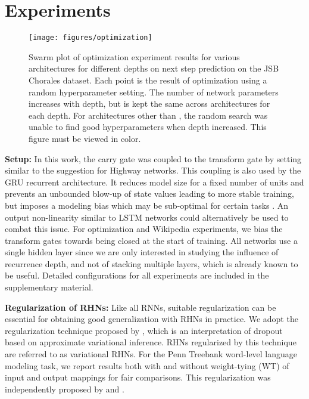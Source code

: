 \documentclass[letterpaper]{article}
\begin{document}
\section{Experiments}\label{sec:experiments}


\begin{figure*}[t]
\begin{center}
\texttt{[image: figures/optimization]}
\caption{Swarm plot of optimization experiment results for various architectures for different depths on next step prediction on the JSB Chorales dataset. Each point is the result of optimization using a random hyperparameter setting. The number of network parameters increases with depth, but is kept the same across architectures for each depth. For architectures other than \arch{}, the random search was unable to find good hyperparameters when depth increased. This figure must be viewed in color.}
\label{fig:optimization}
\end{center}
\end{figure*}


\textbf{Setup:}
In this work, the carry gate was coupled to the transform gate by setting  similar to the suggestion for Highway networks.
This coupling is also used by the GRU recurrent architecture.
It reduces model size for a fixed number of units and prevents an unbounded blow-up of state values leading to more stable training, but imposes a modeling bias which may be sub-optimal for certain tasks \citep{greff2015lstm,jozefowicz2015}. 
An output non-linearity similar to LSTM networks could alternatively be used to combat this issue.
For optimization and Wikipedia experiments, we bias the transform gates towards being closed at the start of training.
All networks use a single hidden \arch{} layer since we are only interested in studying the influence of recurrence depth, and not of stacking multiple layers, which is already known to be useful.
Detailed configurations for all experiments are included in the supplementary material.


\textbf{Regularization of RHNs:}
Like all RNNs, suitable regularization can be essential for obtaining good generalization with RHNs in practice.
We adopt the regularization technique proposed by \citet{gal2015}, which is an interpretation of dropout based on approximate variational inference.
RHNs regularized by this technique are referred to as variational RHNs.
For the Penn Treebank word-level language modeling task, we report results both with and without weight-tying (WT) of input and output mappings for fair comparisons. This regularization was independently proposed by \citet{shared_embedding} and \citet{weight_tying}.
\end{document}
